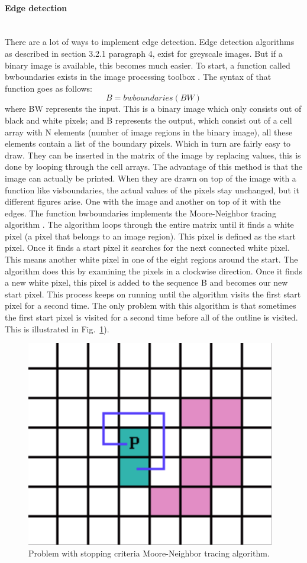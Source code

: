 \documentclass{article}
\begin{document}
\paragraph{Edge detection}\mbox{}\\
There are a lot of ways to implement edge detection. Edge detection algorithms as described in section 3.2.1 paragraph 4, exist for greyscale images. But if a binary image is available, this becomes much easier. To start, a function called bwboundaries exists in the image processing toolbox \cite{Mathworks}. The syntax of that function goes as follows: 
\begin{equation}
B = bwboundaries (BW)
\end{equation}
where BW represents the input. This is a binary image which only consists out of black and white pixels; and B represents the output, which consist out of a cell array with N elements (number of image regions in the binary image), all these elements contain a list of the boundary pixels. Which in turn are fairly easy to draw. They can be inserted in the matrix of the image by replacing values, this is done by looping through the cell arrays. The advantage of this method is that the image can actually be printed. When they are drawn on top of the image with a function like visboundaries, the actual values of the pixels stay unchanged, but it different figures arise. One with the image and another on top of it with the edges. 
The function bwboundaries implements the Moore-Neighbor tracing algorithm \cite{Moore_Neighborhood}. The algorithm loops through the entire matrix until it finds a white pixel (a pixel that belongs to an image region). This pixel is defined as the start pixel. Once it finds a start pixel it searches for the next connected white pixel. This means another white pixel in one of the eight regions around the start. The algorithm does this by examining the pixels in a clockwise direction. Once it finds a new white pixel, this pixel is added to the sequence B and becomes our new start pixel. This process keeps on running until the algorithm visits the first start pixel for a second time. The only problem with this algorithm is that sometimes the first start pixel is visited for a second time before all of the outline is visited. This is illustrated in Fig.~\ref{fig:Moore_Neighbor}).

\begin{figure}[h]
	\center
  \includegraphics[width=0.3\linewidth]{Moore_Neighbor.png}
  \caption{Problem with stopping criteria Moore-Neighbor tracing algorithm.\cite{Moore_Neighborhood}}
  \label{fig:Moore_Neighbor}
\end{figure}
\end{document}
